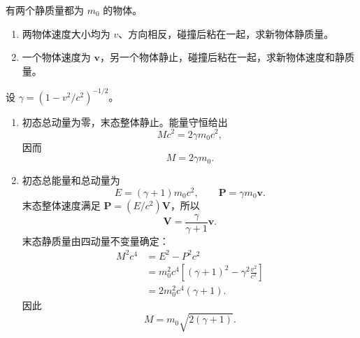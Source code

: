 \begin{question}[两个物体完全非弹性碰撞的相对论运动学]
有两个静质量都为 $m_0$ 的物体。
\begin{enumerate}
  \item 两物体速度大小均为 $v$、方向相反，碰撞后粘在一起，求新物体静质量。
  \item 一个物体速度为 $\mathbf v$，另一个物体静止，碰撞后粘在一起，求新物体速度和静质量。
\end{enumerate}
\begin{solution}
设 $\gamma=(1-v^2/c^2)^{-1/2}$。
\begin{enumerate}
  \item 初态总动量为零，末态整体静止。能量守恒给出
  \[
    Mc^2=2\gamma m_0c^2,
  \]
  因而
  \[
    \boxed{M=2\gamma m_0} .
  \]

  \item 初态总能量和总动量为
  \[
    E=(\gamma+1)m_0c^2,
    \qquad
    \mathbf P=\gamma m_0\mathbf v .
  \]
  末态整体速度满足 $\mathbf P=(E/c^2)\mathbf V$，所以
  \[
    \boxed{\mathbf V=\frac{\gamma}{\gamma+1}\mathbf v} .
  \]
  末态静质量由四动量不变量确定：
  \[
  \begin{aligned}
    M^2c^4&=E^2-P^2c^2 \\
    &=m_0^2c^4\left[(\gamma+1)^2-\gamma^2\frac{v^2}{c^2}\right] \\
    &=2m_0^2c^4(\gamma+1) .
  \end{aligned}
  \]
  因此
  \[
    \boxed{M=m_0\sqrt{2(\gamma+1)}} .
  \]
\end{enumerate}
\end{solution}
\end{question}

